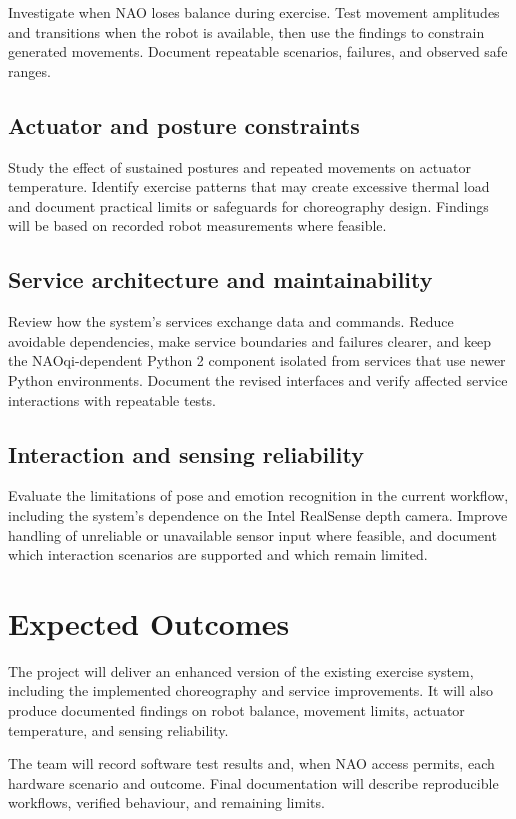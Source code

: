 \documentclass[12pt,a4paper]{article}
\begin{document}
Investigate when NAO loses balance during exercise. Test movement amplitudes and transitions when the robot is available, then use the findings to constrain generated movements. Document repeatable scenarios, failures, and observed safe ranges.

\subsection{Actuator and posture constraints}

Study the effect of sustained postures and repeated movements on actuator temperature. Identify exercise patterns that may create excessive thermal load and document practical limits or safeguards for choreography design. Findings will be based on recorded robot measurements where feasible.

\subsection{Service architecture and maintainability}

Review how the system's services exchange data and commands. Reduce avoidable dependencies, make service boundaries and failures clearer, and keep the NAOqi-dependent Python 2 component isolated from services that use newer Python environments. Document the revised interfaces and verify affected service interactions with repeatable tests.

\subsection{Interaction and sensing reliability}

Evaluate the limitations of pose and emotion recognition in the current workflow, including the system's dependence on the Intel RealSense depth camera. Improve handling of unreliable or unavailable sensor input where feasible, and document which interaction scenarios are supported and which remain limited.

\section{Expected Outcomes}

The project will deliver an enhanced version of the existing exercise system, including the implemented choreography and service improvements. It will also produce documented findings on robot balance, movement limits, actuator temperature, and sensing reliability.

The team will record software test results and, when NAO access permits, each hardware scenario and outcome. Final documentation will describe reproducible workflows, verified behaviour, and remaining limits.
\end{document}
